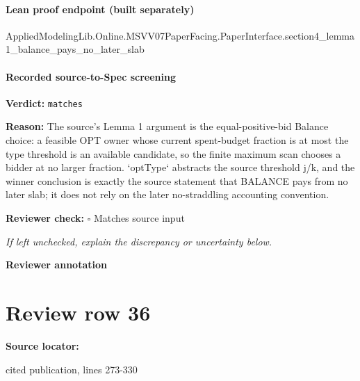 \documentclass[10pt]{article}
\newcommand{\reviewerbox}{%
  \par\noindent\fbox{\parbox{0.96\linewidth}{\rule{0pt}{0.38in}}}\par
}
\newcommand{\reviewmatch}[1]{%
  \par\noindent\textbf{Reviewer check:} $\square$\; #1\par
  \noindent\emph{If left unchecked, explain the discrepancy or uncertainty below.}\par
}
\begin{document}
\paragraph{Lean proof endpoint (built separately)}\begin{ReviewVerbatim}
AppliedModelingLib.Online.MSVV07PaperFacing.PaperInterface.section4_lemma1_balance_pays_no_later_slab
\end{ReviewVerbatim}

\paragraph{Recorded source-to-Spec screening}
\textbf{Verdict:} \texttt{matches}
\\
{\raggedright
\textbf{Reason:} The source's Lemma 1 argument is the equal-\allowbreak{}positive-\allowbreak{}bid Balance choice:\allowbreak{} a feasible OPT owner whose current spent-\allowbreak{}budget fraction is at most the type threshold is an available candidate, so the finite maximum scan chooses a bidder at no larger fraction.\allowbreak{} `optType` abstracts the source threshold j/\allowbreak{}k, and the winner conclusion is exactly the source statement that BALANCE pays from no later slab;\allowbreak{} it does not rely on the later no-\allowbreak{}straddling accounting convention.\allowbreak{}
\par}
\reviewmatch{Matches source input}
\noindent\textbf{Reviewer annotation}\par
\reviewerbox
\clearpage
\hypertarget{source-claim-156f8b772d6e0747}{}
\section*{Review row 36}
\textbf{Source locator:} {\footnotesize\raggedright cited publication, lines 273-\allowbreak{}330\par}
\end{document}
